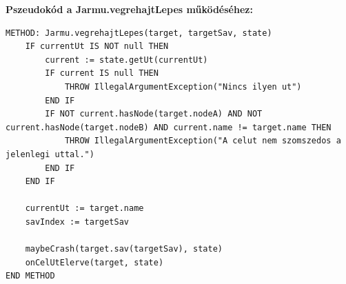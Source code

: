 \textbf{Pszeudokód a Jarmu.vegrehajtLepes működéséhez:}
\begin{verbatim}
METHOD: Jarmu.vegrehajtLepes(target, targetSav, state)
    IF currentUt IS NOT null THEN
        current := state.getUt(currentUt)
        IF current IS null THEN
            THROW IllegalArgumentException("Nincs ilyen ut")
        END IF
        IF NOT current.hasNode(target.nodeA) AND NOT current.hasNode(target.nodeB) AND current.name != target.name THEN
            THROW IllegalArgumentException("A celut nem szomszedos a jelenlegi uttal.")
        END IF
    END IF
    
    currentUt := target.name
    savIndex := targetSav
    
    maybeCrash(target.sav(targetSav), state)
    onCelUtElerve(target, state)
END METHOD
\end{verbatim}


